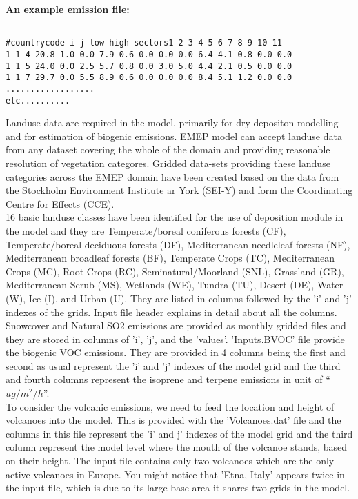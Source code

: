 \textbf{An example emission file:}

\begin{verbatim}

#countrycode i j low high sectors1 2 3 4 5 6 7 8 9 10 11 
1 1 4 20.8 1.0 0.0 7.9 0.6 0.0 0.0 0.0 6.4 4.1 0.8 0.0 0.0
1 1 5 24.0 0.0 2.5 5.7 0.8 0.0 3.0 5.0 4.4 2.1 0.5 0.0 0.0
1 1 7 29.7 0.0 5.5 8.9 0.6 0.0 0.0 0.0 8.4 5.1 1.2 0.0 0.0
..................
etc..........

\end{verbatim}

Landuse data are required in the model, primarily for dry
depositon modelling and for estimation of biogenic emissions.  EMEP
model can accept landuse data from any dataset covering the whole of
the domain and providing reasonable resolution of vegetation
categores.  Gridded data-sets providing these landuse categories
across the EMEP domain have been created based on the data from the
Stockholm Environment Institute ar York (SEI-Y) and form the
Coordinating Centre for Effects (CCE).\\

 16 basic landuse classes have
been identified for the use of deposition module in the model and they
are Temperate/boreal coniferous forests (CF), Temperate/boreal
deciduous forests (DF), Mediterranean needleleaf forests (NF),
Mediterranean broadleaf forests (BF), Temperate Crops (TC),
Mediterranean Crops (MC), Root Crops (RC), Seminatural/Moorland (SNL),
Grassland (GR), Mediterranean Scrub (MS), Wetlands (WE), Tundra (TU),
Desert (DE), Water (W), Ice (I), and Urban (U).  They are listed in
columns followed by the 'i' and 'j' indexes of the
grids. Input file header explains in detail about all the
columns. \\

Snowcover and Natural SO2 emissions are provided as monthly gridded
files and they are stored in columns of 'i', 'j', and the
'values'. 'Inputs.BVOC' file provide the biogenic VOC emissions.  They
are provided in 4 columns being the first and second as usual
represent the 'i' and 'j' indexes of the model grid and the third and
fourth columns represent the isoprene and terpene emissions in unit of
``$ug/m^{2}/h$''.\\
 

To consider the volcanic emissions, we need to feed the location and
height of volcanoes into the model.  This is provided with the
'Volcanoes.dat' file and the columns in this file represent the 'i'
and j' indexes of the model grid and the third column represent the
model level where the mouth of the volcanoe stands, based on their
height.  The input file contains only two volcanoes which are the only
active volcanoes in Europe.  You might notice that 'Etna, Italy'
appears twice in the input file, which is due to its large base area
it shares two grids in the model.  \\
     

